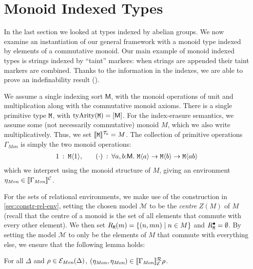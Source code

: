 \section{Monoid Indexed Types}
\label{sec:monoid-indexed-types}

\newcommand{\Mon}{\textit{Mon}}

In the last section we looked at types indexed by abelian groups. We
now examine an instantiation of our general framework with a monoid
type indexed by elements of a commutative monoid. Our main example of
monoid indexed types is strings indexed by ``taint'' markers: when
strings are appended their taint markers are combined. Thanks to the
information in the indexes, we are able to prove an indefinability
result ().

We assume a single indexing sort $\mathsf{M}$, with the monoid
operations of unit and multiplication along with the commutative
monoid axioms. There is a single primitive type $\texttt{M}$, with
$\mathrm{tyArity}(\texttt{M}) = [\mathsf{M}]$. For the index-erasure
semantics, we assume some (not necessarily commutative) monoid $M$,
which we also write multiplicatively. Thus, we set
$\llbracket \texttt{M} \rrbracket^{\mathcal{T}_0} = M$. The collection of primitive operations
$\Gamma_{\mathit{Mon}}$ is simply the two monoid operations:
\begin{displaymath}
  \begin{array}{r@{\hspace{0.5em}:\hspace{0.5em}}l@{\hspace{2em}}r@{\hspace{0.5em}:\hspace{0.5em}}l}
    1 & \tyPrim{M}{1}, &
    (\cdot) & \forall a,b\mathord:\mathsf{M}.\ \tyPrim{M}{a} \to \tyPrim{M}{b} \to \tyPrim{M}{a b}
  \end{array}
\end{displaymath}
which we interpret using the monoid structure of $M$, giving an
environment $\eta_\Mon \in \ctxtSem{\Gamma_\Mon}$.

For the sets of relational environments, we make use of the
construction in \autoref{sec:constr-rel-env}, setting the chosen model
$\mathcal{M}$ to be the \emph{centre} $Z(M)$ of $M$ (recall that the
centre of a monoid is the set of all elements that commute with every
other element). We then set $R_{\texttt{M}}(m) = \{ (n,mn) \mathrel| n
\in M \}$ and $R^\bullet_{\texttt{M}} = \emptyset$. By setting the
model $\mathcal{M}$ to only be the elements of $M$ that commute with
everything else, we ensure that the following lemma holds:
\begin{lemma}
  For all $\Delta$ and $\rho \in \relEnv{E}_\Mon(\Delta)$,
  $(\eta_\Mon,\eta_\Mon) \in \rsem{\Gamma_\Mon}{\relEnv{E}}\rho$.
\end{lemma}

